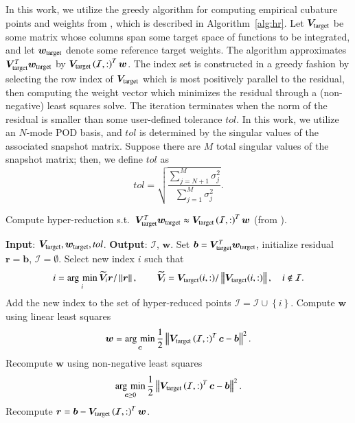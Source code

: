\documentclass[preprint,10pt]{elsarticle}
\theoremstyle{definition}
\theoremstyle{lemma}
\theoremstyle{theorem}
\theoremstyle{assumption}
\DeclareMathOperator*{\argmin}{\arg\,\min}
\renewcommand{\tilde}{\widetilde}
\newcommand{\nor}[1]{\left\| #1 \right\|}
\newcommand{\LRp}[1]{\left( #1 \right)}
\newcommand{\LRc}[1]{\left\{ #1 \right\}}
\newcommand{\rnote}[1]{{\color{red}{#1}}}
\begin{document}
In this work, we utilize the greedy algorithm for computing empirical cubature points and weights from \cite{an2008optimizing, hernandez2017dimensional}, which is described in Algorithm~\ref{alg:hr}.  
\rnote{Because we assume a fixed reduced basis in time, we compute a single set of empirical cubature points prior to the simulation and use those same points over the entire duration of the simulation.}
Let $\bm{V}_{\rm target}$ be some matrix whose columns span some target space of functions to be integrated, and let $\bm{w}_{\rm target}$ denote some reference target weights.  The algorithm approximates $\bm{V}_{\rm target}^T\bm{w}_{\rm target}$ by $\bm{V}_{\rm target}\LRp{\mathcal{I},:}^T\bm{w}$.  The index set is constructed in a greedy fashion by selecting the row index of $\bm{V}_{\rm target}$ which is most positively parallel to the residual, then computing the weight vector which minimizes the residual through a (non-negative) least squares solve.  The iteration terminates when the norm of the residual is smaller than some user-defined tolerance $tol$.  In this work, we utilize an $N$-mode POD basis, and $tol$ is determined by the singular values of the associated snapshot matrix.  Suppose there are $M$ total singular values of the snapshot matrix; then, we define $tol$ as
\[
tol = \sqrt{\frac{\sum_{j=N+1}^M \sigma_j^2}{\sum_{j=1}^M \sigma_j^2}}.
\]


\begin{algorithm}[!h]
\caption{Compute hyper-reduction s.t.\ $\bm{V}_{\rm target}^T\bm{w}_{\rm target} \approx \bm{V}_{\rm target}\LRp{\mathcal{I},:}^T\bm{w}$ (from \cite{hernandez2017dimensional}).}
\begin{algorithmic}[1]
\STATE \textbf{Input}: $\bm{V}_{\rm target}, \bm{w}_{\rm target}, tol$.
\STATE \textbf{Output}: $\mathcal{I}$, $\bm{w}$.
\STATE Set $\bm{b} = \bm{V}_{\rm target}^T\bm{w}_{\rm target}$, initialize residual $\bm{r} = \bm{b}$, $\mathcal{I} = \emptyset$.
\WHILE {$\nor{\bm{r}}/\nor{\bm{b}} > tol$}
        \STATE Select new index $i$ such that
        \[
        i = \argmin_i \tilde{\bm{V}}_{i}\bm{r}/\nor{\bm{r}}, \qquad
        \tilde{\bm{V}}_i = \bm{V}_{\rm target}(i,:) / \nor{\bm{V}_{\rm target}(i,:)}, \quad i \not\in \mathcal{I}.
        \]
        \STATE Add the new index to the set of hyper-reduced points $\mathcal{I} = \mathcal{I} \cup \LRc{i}$.  
        \STATE Compute $\bm{w}$ using linear least squares
        \[
        \bm{w} = \argmin_{\bm{c}} \frac{1}{2}\nor{\bm{V}_{\rm target}\LRp{\mathcal{I},:}^T\bm{c} - \bm{b}}^2.
        \]
                \STATE Recompute $\bm{w}$ using non-negative least squares 
                \[
                \argmin_{\bm{c} \geq 0} \frac{1}{2}\nor{\bm{V}_{\rm target}\LRp{\mathcal{I},:}^T\bm{c} - \bm{b}}^2.
                \]             
        \ENDIF
        \STATE Recompute $\bm{r} = \bm{b} - \bm{V}_{\rm target}\LRp{\mathcal{I},:}^T\bm{w}$.
\ENDWHILE
\end{algorithmic}
\label{alg:hr}
\end{algorithm}
\end{document}
